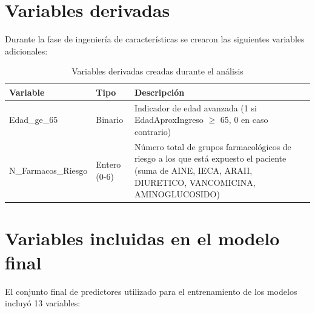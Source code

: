 \documentclass[12pt, a4paper, oneside]{report}
\begin{document}
\section{Variables derivadas}

Durante la fase de ingeniería de características se crearon las siguientes variables adicionales:

\begin{table}[h]
\centering
\begin{tabular}{p{4cm}p{2.5cm}p{7cm}}
\hline
\textbf{Variable} & \textbf{Tipo} & \textbf{Descripción} \\
\hline
Edad\_ge\_65 & Binario & Indicador de edad avanzada (1 si EdadAproxIngreso $\geq$ 65, 0 en caso contrario) \\
N\_Farmacos\_Riesgo & Entero (0-6) & Número total de grupos farmacológicos de riesgo a los que está expuesto el paciente (suma de AINE, IECA, ARAII, DIURETICO, VANCOMICINA, AMINOGLUCOSIDO) \\
\hline
\end{tabular}
\caption{Variables derivadas creadas durante el análisis}
\label{tab:variables_derivadas}
\end{table}

\section{Variables incluidas en el modelo final}

El conjunto final de predictores utilizado para el entrenamiento de los modelos incluyó 13 variables:
\end{document}
